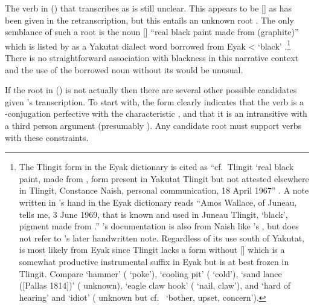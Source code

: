 The verb in (\lastx) that \citeauthor{swanton:1909} transcribes as  is still unclear.
This appears to be  [] as has been given in the retranscription, but this entails an unknown root .
The only semblance of such a root is the noun  [] “real black paint made from  (graphite)” which is listed by \citeauthor{leer:1973} as a Yakutat dialect word \parencite[09/305]{leer:1973} borrowed from Eyak  <  ‘black’ \parencite[713]{krauss:1970}.\footnote{The Tlingit form in the Eyak dictionary is cited as “cf.\ Tlingit  ‘real black paint, made from , form present in Yakutat Tlingit but not attested elsewhere in Tlingit, Constance Naish, personal communication, 18 April 1967” \parencite[713]{krauss:1970}.
A note written in \citeauthor{krauss:1970}’s hand in the Eyak dictionary reads “Amos Wallace, of Juneau, tells me, 3 June 1969, that  is known and used in Juneau Tlingit, ‘black’, pigment made from .” \citeauthor{leer:1973}’s documentation is also from Naish like \citeauthor{krauss:1970}’s \parencite[09/305]{leer:1973}, but \citeauthor{leer:1973} does not refer to \citeauthor{krauss:1970}’s later handwritten note.
Regardless of its use south of Yakutat,  is most likely from Eyak since Tlingit lacks a form without  [] which is a somewhat productive instrumental suffix in Eyak but is at best frozen in Tlingit.
Compare  ‘hammer’ ( ‘poke’),  ‘cooling pit’ ( ‘cold’),  ‘sand lance ([Pallas 1814])’ ( unknown),  ‘eagle claw hook’ ( ‘nail, claw’), and  ‘hard of hearing’ and  ‘idiot’ ( unknown but cf.\  ‘bother, upset, concern’).} There is no straightforward association with blackness in this narrative context and the use of the borrowed noun without its  would be unusual.

If the root in (\lastx) is not actually  then there are several other possible candidates given \citeauthor{swanton:1909}’s transcription.
To start with, the form  clearly indicates that the verb is a -conjugation perfective with the characteristic , and that it is an intransitive with a third person argument (presumably ).
Any candidate root must support verbs with these constraints.

